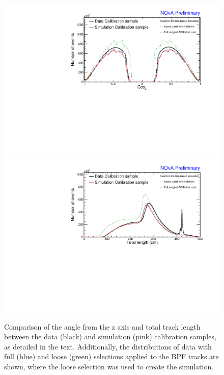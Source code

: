 \begin{figure}[!ht]
\includegraphics[width=\textwidth]{Plots/TBCalibration/DBSim_DataMCComparison_CosZ.pdf}
\includegraphics[width=\textwidth]{Plots/TBCalibration/DBSim_DataMCComparison_TotLength.pdf}
\caption[Data-Simulation comparison of angular and track length distributions]{Comparison of the angle from the z axis and total track length between the data (black) and simulation (pink) calibration samples, as detailed in the text. Additionally, the distributions of data with full (blue) and loose (green) selections applied to the \acrshort{BPF} tracks are shown, where the loose selection was used to create the simulation.}
\label{fig:DataBasedSimDataMCComparison_cosZtotLength}
\end{figure}

